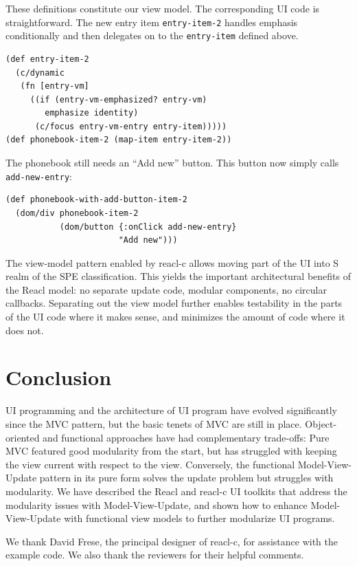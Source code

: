 \documentclass[sigplan,review,screen]{acmart}
\begin{document}
These definitions constitute our view model. The corresponding
UI code is straightforward. The new entry item \texttt{entry-item-2}
handles emphasis conditionally and then delegates on to the
\texttt{entry-item} defined above.
%
\begin{verbatim}
(def entry-item-2
  (c/dynamic
   (fn [entry-vm]
     ((if (entry-vm-emphasized? entry-vm)
        emphasize identity)
      (c/focus entry-vm-entry entry-item)))))
(def phonebook-item-2 (map-item entry-item-2))
\end{verbatim}
%
The phonebook still needs an ``Add new'' button. This button
now simply calls \texttt{add-new-entry}:
%
\begin{verbatim}
(def phonebook-with-add-button-item-2
  (dom/div phonebook-item-2
           (dom/button {:onClick add-new-entry}
                       "Add new")))
\end{verbatim}
%
The view-model pattern enabled by reacl-c allows moving part of the UI
into S realm of the SPE classification.  This yields the important
architectural benefits of the Reacl model: no separate update code,
modular components, no circular callbacks.  Separating out the view
model further enables testability in the parts of the UI code where it
makes sense, and minimizes the amount of code where it does not.

\section{Conclusion}
\label{sec:conclusion}

UI programming and the architecture of UI program have evolved
significantly since the MVC pattern, but the basic tenets of
MVC are still in place.  Object-oriented and functional approaches
have had complementary trade-offs: Pure MVC featured good modularity
from the start, but has struggled with keeping the view current with
respect to the view.
Conversely, the functional Model-View-Update pattern in its pure form
solves the update problem but struggles with modularity.  We have
described the Reacl and reacl-c UI toolkits that address the
modularity issues with Model-View-Update, and shown how to enhance
Model-View-Update with functional view models to further modularize UI
programs.

\begin{acks}
  We thank David Frese, the principal designer of reacl-c, for
  assistance with the example code.  We also thank the reviewers for
  their helpful comments.
\end{acks}



\end{document}
